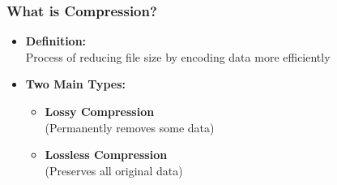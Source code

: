 \documentclass[10pt,aspectratio=43]{beamer}
\begin{document}
\begin{frame}
    \frametitle{\textcolor{myMaroon}{What is Compression?}}
    \begin{itemize}
        \item \textcolor{myMaroon}{\textbf{Definition:}} \\
        Process of reducing file size by encoding data more efficiently
        
        \vspace{0.5cm}
        \item \textcolor{myMaroon}{\textbf{Two Main Types:}}
        \begin{itemize}
            \item \textcolor{myBlue}{\textbf{Lossy Compression}} \\
            (Permanently removes some data)
            
            \item \textcolor{myBlue}{\textbf{Lossless Compression}} \\
            (Preserves all original data)
        \end{itemize}
    \end{itemize}


\end{frame}
\end{document}
